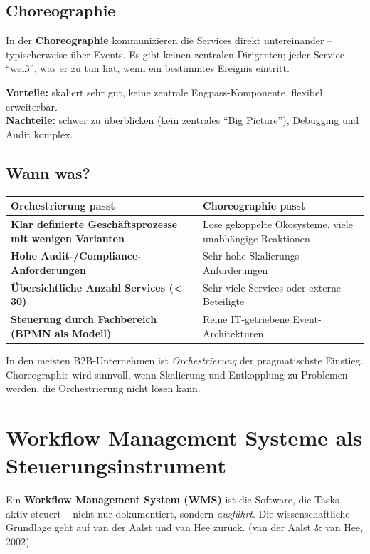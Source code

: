 \documentclass[11pt,a4paper,oneside]{article}
\newcommand{\fachbegriff}[1]{\textbf{#1}}
\newcommand{\quelle}[1]{{\footnotesize\color{lpGray}(#1)}}
\begin{document}
\subsection{Choreographie}

In der \fachbegriff{Choreographie} kommunizieren die Services direkt untereinander -- typischerweise über Events. Es gibt keinen zentralen Dirigenten; jeder Service ``weiß'', was er zu tun hat, wenn ein bestimmtes Ereignis eintritt.

\textbf{Vorteile:} skaliert sehr gut, keine zentrale Engpass-Komponente, flexibel erweiterbar. \\
\textbf{Nachteile:} schwer zu überblicken (kein zentrales ``Big Picture''), Debugging und Audit komplex.

\subsection{Wann was?}

\begin{tabularx}{\linewidth}{@{}>{\bfseries}lX@{}}
\toprule
Orchestrierung passt & Choreographie passt \\
\midrule
Klar definierte Geschäftsprozesse mit wenigen Varianten     & Lose gekoppelte Ökosysteme, viele unabhängige Reaktionen \\
Hohe Audit-/Compliance-Anforderungen                         & Sehr hohe Skalierungs-Anforderungen \\
Übersichtliche Anzahl Services (\textless\,30)               & Sehr viele Services oder externe Beteiligte \\
Steuerung durch Fachbereich (BPMN als Modell)                & Reine IT-getriebene Event-Architekturen \\
\bottomrule
\end{tabularx}

\medskip

\noindent In den meisten B2B-Unternehmen ist \emph{Orchestrierung} der pragmatischste Einstieg. Choreographie wird sinnvoll, wenn Skalierung und Entkopplung zu Problemen werden, die Orchestrierung nicht lösen kann.

\section{Workflow Management Systeme als Steuerungsinstrument}

Ein \fachbegriff{Workflow Management System (WMS)} ist die Software, die Tasks aktiv steuert -- nicht nur dokumentiert, sondern \emph{ausführt}. Die wissenschaftliche Grundlage geht auf van der Aalst und van Hee zurück. \quelle{van der Aalst \& van Hee, 2002}
\end{document}
